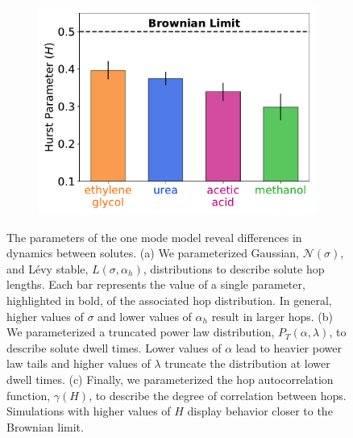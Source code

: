 \documentclass[journal=jctcce,manuscript=article]{achemso}
\begin{document}
\begin{figure}
\begin{subfigure}{0.325\textwidth}
  \includegraphics[width=\textwidth]{hurst_barchart.pdf}
  \caption{}\label{fig:hurst_barchart}
  \end{subfigure}
  \caption{%
		  The parameters of the one mode model reveal differences in dynamics
	      between solutes. (a) We parameterized Gaussian, $\mathcal{N}(\sigma)$, 
	      and L\'evy stable, $L(\sigma, \alpha_h)$, distributions to describe
	      solute hop lengths. Each bar represents the value of a single parameter,
	      highlighted in bold, of the associated hop distribution. In general, 
	      higher values of $\sigma$ and lower values of $\alpha_h$ result in 
	      larger hops. (b) We parameterized a truncated power law distribution, 
	      $P_T(\alpha, \lambda)$, to describe solute dwell times. Lower values
	      of $\alpha$ lead to heavier power law tails and higher values of 
	      $\lambda$ truncate the distribution at lower dwell times. (c) Finally,
	      we parameterized the hop autocorrelation function, $\gamma(H)$, to 
	      describe the degree of correlation between hops. Simulations with 
	      higher values of $H$ display behavior closer to the Brownian limit.
	  }\label{fig:1mode_parameters}
  \end{figure}
  
\end{document}
